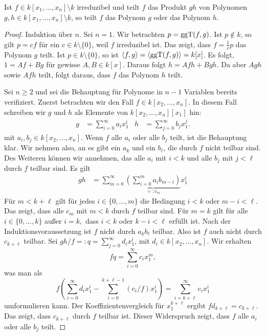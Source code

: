 \documentclass[11pt]{article}
\numberwithin{equation}{section}
\begin{document}
\begin{theorem} 
	Ist $f \in k[x_1,\ldots,x_n] \setminus k$ irreduzibel und teilt $f$ das Produkt $gh$ von Polynomen $g,h \in k[x_1,\ldots,x_n] \setminus k$, so teilt $f$ das Polynom $g$ oder das Polynom $h$. 
\end{theorem} 
\begin{proof} 
	Induktion über $n$. Sei $n=1$. Wir betrachten 
	$p= \operatorname{ggT}(f,g)$. Ist $p \not \in k$, so gilt $p = c f$ für ein $c \in k \setminus \{0\}$, weil $f$ irreduzibel ist. Das zeigt, dass $ f= \frac{1}{c} p $ das Polynom $g$ teilt. Ist $p \in k \setminus \{0\}$, so ist $\left<  f, g \right> = \left<  \operatorname{ggT}(f,g)  \right> = k[x]$. Es folgt, $1 = A f + B g$ für gewisse $A, B \in k[x]$. Daraus folgt $h = A f h + B gh$. Da aber $A gh$ sowie $A f h$ teilt, folgt daraus, dass $f$ das Polynom $h$  teilt. 
	
	Sei $n \ge 2$ und sei die Behauptung für Polynome in $n-1$ Variablen bereits verifiziert. Zuerst betrachten wir den Fall $f \in k[x_2,\ldots,x_n]$. In diesem Fall schreiben wir $g$ und $h$ als Elemente von $k[x_2,\ldots,x_n][x_1]$ hin: 
	\begin{align*}
		g & = \sum_{i=0}^{\infty} a_i x_1^i &  h & = \sum_{j=0}^{\infty} b_j x_1^j. 
	\end{align*} 
	mit $a_i, b_j \in k[x_2,\ldots,x_n]$. Wenn $f$ alle $a_i$ oder alle $b_j$ teilt, ist die Behauptung klar. Wir nehmen also, an es gibt ein $a_k$ und ein $b_\ell$, die durch $f$ nicht teilbar sind. Des Weiteren können wir annehmen, das alle $a_i$ mit $i < k$ und alle $b_j$ mit $j < \ell$ durch $f$ teilbar sind. Es gilt
	\begin{align*}
		g h & = \sum_{m=0}^\infty \underbrace{ \left( \sum_{i=0}^m a_i b_{m-i}  \right) }_{=:c_m} x_1^i
	\end{align*} 
	Für $m < k + \ell$ gilt für jedes $i \in \{0,\ldots, m\}$ die Bedingung $i < k$ oder $m- i < \ell$. Das zeigt, dass alle $c_m$ mit $m < k$ durch $f$ teilbar sind. Für $m=k$ gilt für alle $i \in \{0,\ldots, k\}$ außer $i=k,$ dass $i< k$ oder $k-i < \ell$ erfüllt ist. Nach der Induktionsvoraussetzung ist $f$ nicht durch $a_k b_\ell$ teilbar. Also ist $f$ auch nicht durch $c_{k+\ell}$ teilbar. Sei $gh / f =: q = \sum_{j=0}^\infty d_i x_1^i$, mit $d_i \in k[x_2,\ldots,x_n]$. Wir erhalten 
	\[
	f q = \sum_{i=0}^\infty c_i x_1^m,
	\]
	was man als 
	\[
	f( \sum_{i=0}^\infty d_i x_1^i - \sum_{i=0}^{k+\ell-1} (c_i / f) x_1^i ) = \sum_{i=k+\ell}^\infty c_i x_1^i
	\]
	umformulieren kann. Der Koeffizientenvergleich für $x_1^{k+\ell}$ ergibt $f d_{k+\ell} = c_{k+\ell}$. Das zeigt, dass $c_{k+\ell}$ durch $f$ teilbar ist. Dieser Widerspruch zeigt, dass $f$ alle $a_i$ oder alle $b_j$ teilt. 
	

\end{proof}
\end{document}
